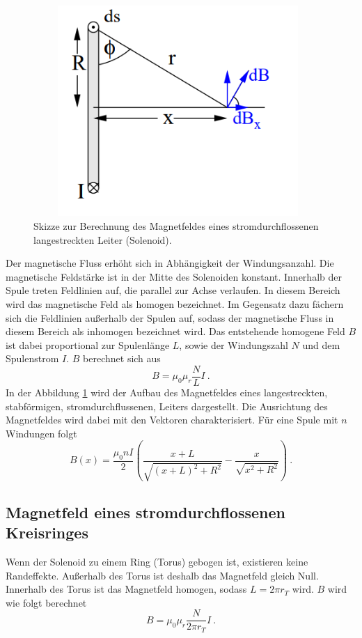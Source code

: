 \begin{figure}
  \centering
  \includegraphics[width=11cm, height=8cm]{content/bilder/Spule1.PNG}
  \caption{Skizze zur Berechnung des Magnetfeldes eines stromdurchflossenen langestreckten Leiter (Solenoid).\cite{Anleitung}}
  \label{fig:Spule1}
\end{figure}

\noindent Der magnetische Fluss erhöht sich in Abhängigkeit der Windungsanzahl.
Die magnetische Feldstärke ist in der Mitte des Solenoiden konstant.
Innerhalb der Spule treten Feldlinien auf, die parallel zur Achse verlaufen.
In diesem Bereich wird das magnetische Feld als homogen bezeichnet.
Im Gegensatz dazu fächern sich die Feldlinien außerhalb der Spulen auf,
sodass der magnetische Fluss in diesem Bereich als inhomogen bezeichnet wird.
Das entstehende homogene Feld $B$ ist dabei proportional zur Spulenlänge $L$,
sowie der Windungszahl $N$ und dem Spulenstrom $I$. $B$ berechnet sich aus
\begin{equation}
  B = μ_0 μ_r \frac{N}{L}I \:.
\end{equation}
In der Abbildung \ref{fig:Spule1} wird der Aufbau des Magnetfeldes eines langestreckten,
stabförmigen, stromdurchflussenen, Leiters dargestellt.
Die Ausrichtung des Magnetfeldes wird dabei mit den Vektoren charakterisiert.
Für eine Spule mit $n$ Windungen folgt
\begin{equation}
      B(x) = \frac{μ_0 n I}{2} \left(\frac{x+L}{\sqrt{(x+L)^2 + R^2}} - \frac{x}{\sqrt{x^2 + R^2}} \right) \:.
      \label{eqn:theoriespule}
\end{equation}
\subsection{Magnetfeld eines stromdurchflossenen Kreisringes}
Wenn der Solenoid zu einem Ring (Torus) gebogen ist, existieren keine Randeffekte.
Außerhalb des Torus ist deshalb das Magnetfeld gleich Null.
Innerhalb des Torus ist das Magnetfeld homogen, sodass $L=2 π r_T$ wird.
$B$ wird wie folgt berechnet
\begin{equation}
  B = μ_0 μ_r \frac{N}{2 π r_T}I \:.
\end{equation}

